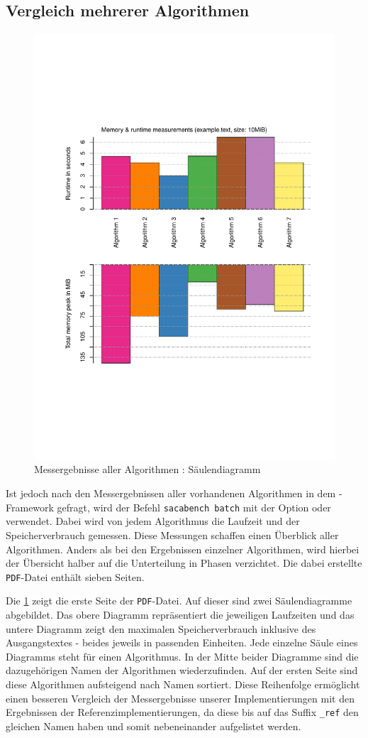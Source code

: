 \subsection{Vergleich mehrerer Algorithmen}
\label{framework:bechmark:sacabench-batch}

\begin{figure}
	\includegraphics[page = 1, width=.5\textwidth]{kapitel/3_framework/benchmark/sacabench-batch/beispiel_batch_saeule.pdf}
	\caption{Messergebnisse aller Algorithmen : Säulendiagramm}
	\label{pdf:benchmark:batch:saeule}
\end{figure}

Ist jedoch nach den Messergebnissen aller vorhandenen Algorithmen in dem \sacabench-Framework gefragt, wird der Befehl \texttt{sacabench batch} mit der Option  oder  verwendet. Dabei wird von jedem Algorithmus die Laufzeit und der Spei\-cher\-ver\-brauch gemessen. Diese Messungen schaffen einen Überblick aller Algorithmen. Anders als bei den Ergebnissen einzelner Algorithmen, wird hierbei der Übersicht halber auf die Unterteilung in Phasen verzichtet. Die dabei erstellte \texttt{PDF}-Datei enthält sieben Seiten.

Die \cref{pdf:benchmark:batch:saeule} zeigt die erste Seite der \texttt{PDF}-Datei. Auf dieser sind zwei Säulendiagramme abgebildet. Das obere Diagramm repräsentiert die jeweiligen Laufzeiten und das untere Diagramm zeigt den maximalen Spei\-cher\-ver\-brauch inklusive des Ausgangstextes - beides jeweils in passenden Einheiten. Jede einzelne Säule eines Diagramms steht für einen Algorithmus. In der Mitte beider Diagramme sind die dazugehörigen Namen der Algorithmen wiederzufinden. Auf der ersten Seite sind diese Algorithmen aufsteigend nach Namen sortiert. Diese Reihenfolge ermöglicht einen besseren Vergleich der Messergebnisse unserer Implementierungen mit den Ergebnissen der Referenzimplementierungen, da diese bis auf das Suffix \texttt{\_ref} den gleichen Namen haben und somit nebeneinander aufgelistet werden.

